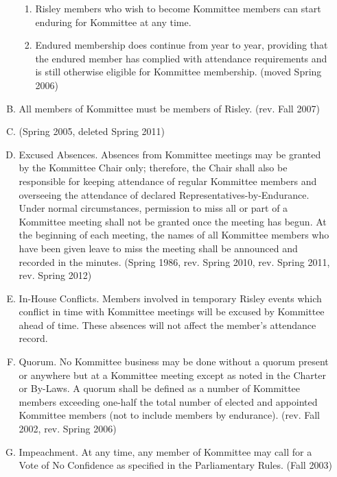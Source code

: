 \documentclass[12pt]{article}
\begin{document}
\begin{enumerate}[A.]
\begin{enumerate}[A.]
\begin{enumerate}[1.]
\item Risley members who wish to become Kommittee members can start enduring for Kommittee at any time.
\item Endured membership does continue from year to year, providing that the endured member has complied with attendance requirements and is still otherwise eligible for Kommittee membership. (moved Spring 2006)
\end{enumerate}
\item All members of Kommittee must be members of Risley. (rev. Fall 2007)

\item (Spring 2005, deleted Spring 2011)

\item Excused Absences. Absences from Kommittee meetings may be granted by the Kommittee Chair only; therefore, the Chair shall also be responsible for keeping attendance of regular Kommittee members and overseeing the attendance of declared Representatives-by-Endurance. Under normal circumstances, permission to miss all or part of a Kommittee meeting shall not be granted once the meeting has begun. At the beginning of each meeting, the names of all Kommittee members who have been given leave to miss the meeting shall be announced and recorded in the minutes. (Spring 1986, rev. Spring 2010, rev. Spring 2011, rev. Spring 2012)

\item In-House Conflicts. Members involved in temporary Risley events which conflict in time with Kommittee meetings will be excused by Kommittee ahead of time. These absences will not affect the member's attendance record. 

\item Quorum. No Kommittee business may be done without a quorum present or anywhere but at a Kommittee meeting except as noted in the Charter or By-Laws. A quorum shall be defined as a number of Kommittee members exceeding one-half the total number of elected and appointed Kommittee members (not to include members by endurance). (rev. Fall 2002, rev. Spring 2006)

\item Impeachment. At any time, any member of Kommittee may call for a Vote of No Confidence as specified in the Parliamentary Rules. (Fall 2003)
\end{enumerate}
\end{enumerate}
\end{document}
